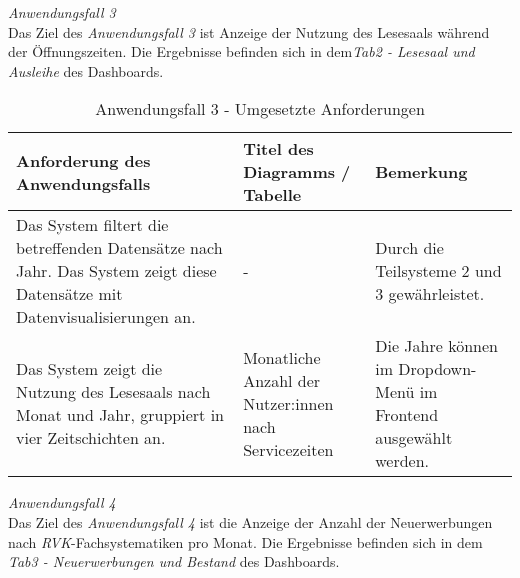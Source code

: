 \clearpage
\noindent
\textit{Anwendungsfall 3}\\
Das Ziel des \textit{Anwendungsfall 3} ist Anzeige der Nutzung des Lesesaals während der Öffnungszeiten.
Die Ergebnisse befinden sich in dem\textit{Tab2 - Lesesaal und Ausleihe} des Dashboards.

\begingroup
    \setlength{\tabcolsep}{12pt} %
    \renewcommand{\arraystretch}{1.2}
    \begin{table}[H]
        \large
        \centering
        \begin{adjustbox}{max width=\textwidth}
        \begin{tabular}{p{}p{}p{}}
           \toprule
           Anforderung des Anwendungsfalls        &Titel des Diagramms / Tabelle &Bemerkung\\
           \midrule
           Das System filtert die betreffenden Datensätze nach Jahr. Das System zeigt diese Datensätze mit Datenvisualisierungen an.&-&Durch die Teilsysteme 2  und 3 gewährleistet.\\
           Das System zeigt die Nutzung des Lesesaals nach Monat und Jahr, gruppiert in vier Zeitschichten an.&Monatliche Anzahl der Nutzer:innen nach Servicezeiten& Die Jahre können im Dropdown-Menü im Frontend ausgewählt werden.\\

        \bottomrule
        \end{tabular}
        \end{adjustbox}
        \caption{%
            Anwendungsfall 3 - Umgesetzte Anforderungen
        }
        \label{tab:Anwendungsfall 3 - Umgesetzte Anforderungen}
        \end{table}
\endgroup

\clearpage
\noindent
\textit{Anwendungsfall 4}\\
Das Ziel des \textit{Anwendungsfall 4} ist die Anzeige der Anzahl der Neuerwerbungen nach \textit{\acrshort{RVK}}-Fachsystematiken pro Monat.
Die Ergebnisse befinden sich in dem \textit{Tab3 - Neuerwerbungen und Bestand} des Dashboards.

